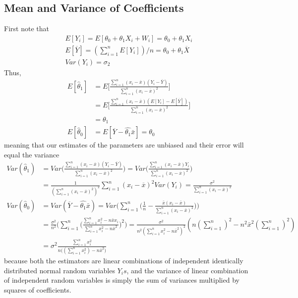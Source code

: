 \documentclass[../probability-notes.tex]{subfiles}
\begin{document}
    \subsection{Mean and Variance of Coefficients}
    First note that
    \begin{align*}
        E[Y_{i}] = E[\theta_{0} + \theta_{1}X_{i} + W_{i}] = \theta_{0} + \theta_{1}X_{i}\\
        E[\overline{Y}] = (\sum_{i=1}^{n} E[Y_{i}])/n = \theta_{0} + \theta_{1}\overline{X}\\
        Var(Y_{i}) = \sigma_{2}
    \end{align*}
    Thus,
    \begin{align*}
        E[\hat{\theta}_{1}] &= E\bigg[ \frac{\sum_{i=1}^{n} (x_{i} - \overline{x}) (Y_{i} - \overline{Y})}{\sum_{i=1}^{n}(x_{i} - \overline{x})^{2}} \bigg]\\ 
        &= E\bigg[ \frac{\sum_{i=1}^{n} (x_{i} - \overline{x}) (E[Y_{i}] - E[\overline{Y}])}{\sum_{i=1}^{n}(x_{i} - \overline{x})^{2}} \bigg]\\
        &= \theta_{1}\\
        E[\hat{\theta}_{0}] &= E[\overline{Y} - \hat{\theta_{1}} \bar{x}] = \theta_{0}
    \end{align*}
    meaning that our estimates of the parameters are unbiased and their error will equal the variance
    \begin{align*}
        Var(\hat{\theta}_{1}) &= Var \bigg( \frac{\sum_{i=1}^{n} (x_{i} - \overline{x}) (Y_{i} - \overline{Y})}{\sum_{i=1}^{n}(x_{i} - \overline{x})^{2}} \bigg)
        = Var \bigg( \frac{\sum_{i=1}^{n} (x_{i} - \overline{x})Y_{i}}{\sum_{i=1}^{n}(x_{i} - \overline{x})^{2}} \bigg)\\
        &= \frac{1}{(\sum_{i=1}^{n}(x_{i} - \overline{x})^{2})^{2}} \sum_{i=1}^{n} (x_{i} - \overline{x})^{2} Var(Y_{i})
        = \frac{\sigma^{2}}{\sum_{i=1}^{n}(x_{i} - \overline{x})^{2}}\\
        Var(\hat{\theta}_{0}) &= Var(\overline{Y} - \hat{\theta_{1}} \bar{x})
        = Var \bigg( \sum_{i=1}^{n} \bigg( \frac{1}{n} - \frac{\bar{x}(x_{i} - \bar{x})}{\sum_{i=1}^{n}(x_{i} - \bar{x})^{2}} \bigg) \bigg)\\
        &= \frac{\sigma^{2}}{n^{2}} \bigg( \sum_{i=1}^{n} \bigg( \frac{\sum_{i=1}^{n}x_{i}^{2} - n\bar{x}x_{i}}{\sum_{i=1}^{n}x_{i}^{2} - n\bar{x}^{2}} \bigg)^{2} \bigg)
        = \frac{\sigma^{2}}{n^{2} (\sum_{i=1}^{n}x_{i}^{2} - n\bar{x}^{2})^{2}} (n(\sum_{i=1}^{n})^{2} - n^{2}\bar{x}^{2}(\sum_{i=1}^{n})^{2})\\
        &= \sigma^{2} \frac{\sum_{i=1}^{n} x_{i}^{2}}{n\big((\sum_{i=1}^{n} x_{i}^{2}) - n\bar{x}^{2} \big)}
    \end{align*}
    because both the estimators are linear combinations of independent identically distributed normal random variables $Y_{i}s$, and the variance of linear combination of independent random variables is simply the sum of variances multiplied by squares of coefficients.\newline
\end{document}
